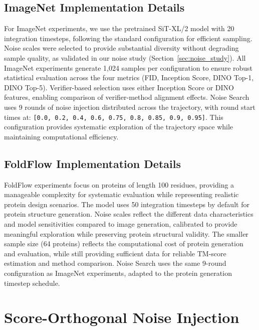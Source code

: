 \documentclass{article} %
\begin{document}
\subsection{ImageNet Implementation Details}
\label{app:imagenet-details}

For ImageNet experiments, we use the pretrained SiT-XL/2 model with 20 integration timesteps, following the standard configuration for efficient sampling. Noise scales were selected to provide substantial diversity without degrading sample quality, as validated in our noise study (Section~\ref{sec:noise_study}). All ImageNet experiments generate 1,024 samples per configuration to ensure robust statistical evaluation across the four metrics (FID, Inception Score, DINO Top-1, DINO Top-5). Verifier-based selection uses either Inception Score or DINO features, enabling comparison of verifier-method alignment effects. Noise Search uses 9 rounds of noise injection distributed across the trajectory, with round start times at: \texttt{[0.0, 0.2, 0.4, 0.6, 0.75, 0.8, 0.85, 0.9, 0.95]}. This configuration provides systematic exploration of the trajectory space while maintaining computational efficiency.

\subsection{FoldFlow Implementation Details}
\label{app:foldflow-details}

FoldFlow experiments focus on proteins of length 100 residues, providing a manageable complexity for systematic evaluation while representing realistic protein design scenarios. The model uses 50 integration timesteps by default for protein structure generation. Noise scales reflect the different data characteristics and model sensitivities compared to image generation, calibrated to provide meaningful exploration while preserving protein structural validity. The smaller sample size (64 proteins) reflects the computational cost of protein generation and evaluation, while still providing sufficient data for reliable TM-score estimation and method comparison. Noise Search uses the same 9-round configuration as ImageNet experiments, adapted to the protein generation timestep schedule.

\section{Score-Orthogonal Noise Injection}
\label{app:score-orthogonal-analysis}
\end{document}
